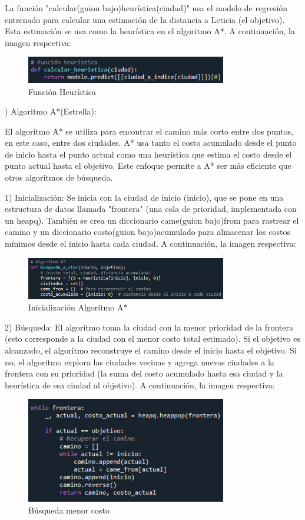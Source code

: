 \documentclass[conference]{IEEEtran}
\begin{document}
\begin{itemize}
	La función "calcular(guion bajo)heurística(ciudad)" usa el modelo de regresión entrenado para calcular una estimación de la distancia a Leticia (el objetivo). Esta estimación se usa como la heurística en el algoritmo A*. A continuación, la imagen respectiva:
		\begin{figure}[ht!] %
			\centering
			\includegraphics[width=3.45in]{Imagen32.png}
			\caption{Función Heurística}
			\label{picture}
		\end{figure}
	) Algoritmo A*(Estrella):
	
	El algoritmo A* se utiliza para encontrar el camino más corto entre dos puntos, en este caso, entre dos ciudades. A* usa tanto el costo acumulado desde el punto de inicio hasta el punto actual como una heurística que estima el costo desde el punto actual hasta el objetivo. Este enfoque permite a A* ser más eficiente que otros algoritmos de búsqueda.
	
	1) Inicialización: Se inicia con la ciudad de inicio (inicio), que se pone en una estructura de datos llamada "frontera" (una cola de prioridad, implementada con un heapq). También se crea un diccionario came(guion bajo)from para rastrear el camino y un diccionario costo(guion bajo)acumulado para almacenar los costos mínimos desde el inicio hasta cada ciudad. A continuación, la imagen respectiva:
		\begin{figure}[ht!] %
			\centering
			\includegraphics[width=3.45in]{Imagen33.png}
			\caption{Inicialización Algoritmo A*}
			\label{picture}
		\end{figure}	
	
	2) Búsqueda: El algoritmo toma la ciudad con la menor prioridad de la frontera (esto corresponde a la ciudad con el menor costo total estimado). Si el objetivo es alcanzado, el algoritmo reconstruye el camino desde el inicio hasta el objetivo. Si no, el algoritmo explora las ciudades vecinas y agrega nuevas ciudades a la frontera con su prioridad (la suma del costo acumulado hasta esa ciudad y la heurística de esa ciudad al objetivo). A continuación, la imagen respectiva:
		\begin{figure}[ht!] %
			\centering
			\includegraphics[width=3.45in]{Imagen34.png}
			\caption{Búsqueda menor costo}
			\label{picture}
		\end{figure}	
	

\end{itemize}
\end{document}
